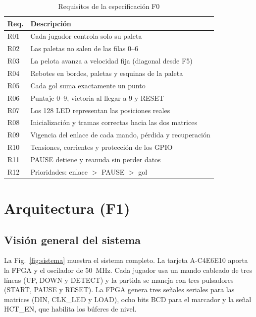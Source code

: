 \documentclass[conference,a4paper]{IEEEtran}
\begin{document}
\begin{table}[!t]
\centering
\caption{Requisitos de la especificación F0}
\label{tab:requisitos}
\footnotesize
\begin{tabularx}{\columnwidth}{@{}l Y@{}}
\toprule
\textbf{Req.} & \textbf{Descripción} \\
\midrule
R01 & Cada jugador controla solo su paleta \\
R02 & Las paletas no salen de las filas 0--6 \\
R03 & La pelota avanza a velocidad fija (diagonal desde F5) \\
R04 & Rebotes en bordes, paletas y esquinas de la paleta \\
R05 & Cada gol suma exactamente un punto \\
R06 & Puntaje 0--9, victoria al llegar a 9 y RESET \\
R07 & Los 128 LED representan las posiciones reales \\
R08 & Inicialización y tramas correctas hacia las dos matrices \\
R09 & Vigencia del enlace de cada mando, pérdida y recuperación \\
R10 & Tensiones, corrientes y protección de los GPIO \\
R11 & PAUSE detiene y reanuda sin perder datos \\
R12 & Prioridades: enlace $>$ PAUSE $>$ gol \\
\bottomrule
\end{tabularx}
\end{table}

\section{Arquitectura (F1)}
\label{sec:arquitectura}

\subsection{Visión general del sistema}

La Fig.~\ref{fig:sistema} muestra el sistema completo. La tarjeta A-C4E6E10 aporta la FPGA y el oscilador de 50~MHz. Cada jugador usa un mando cableado de tres líneas (UP, DOWN y DETECT) y la partida se maneja con tres pulsadores (START, PAUSE y RESET). La FPGA genera tres señales seriales para las matrices (DIN, CLK\_LED y LOAD), ocho bits BCD para el marcador y la señal HCT\_EN, que habilita los búferes de nivel.
\end{document}
